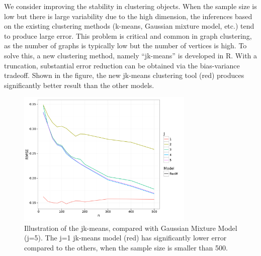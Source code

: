 \documentclass[simplex.tex]{subfiles}
\begin{document}
We consider improving the stability in clustering objects. When the
sample size is low but there is large variability due to the high
dimension, the inferences based on the existing clustering methods
(k-means, Gaussian mixture model, etc.) tend to produce large error.
This problem is critical and common in graph clustering, as the number
of graphs is typically low but the number of vertices is high. To solve
this, a new clustering method, namely ``jk-means'' is developed in R.
With a truncation, substantial error reduction can be obtained via the
bias-variance tradeoff. Shown in the figure, the new jk-means clustering
tool (red) produces significantly better result than the other models.


\begin{figure}[h!]
\begin{cframed}
\centering
\includegraphics[width=0.75\textwidth]{../../figs/jkmeans.png}
\caption{
Illustration of the jk-means, compared with Gaussian Mixture Model (j=5). The j=1 jk-means model (red) has significantly lower error compared to the others, when the sample size is smaller than 500.
}
\label{fig:jkmeans}
\end{cframed}
\end{figure}
\end{document}
